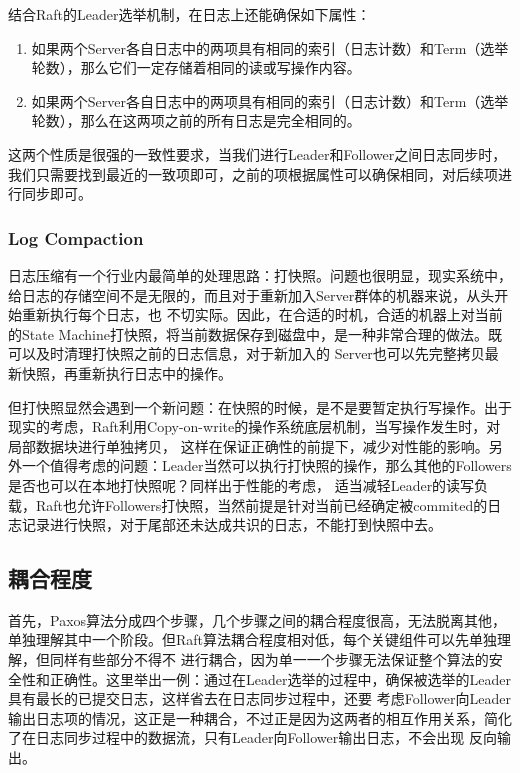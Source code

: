 \documentclass[UTF8]{article}
\begin{document}
结合Raft的Leader选举机制，在日志上还能确保如下属性：
\begin{enumerate}
    \item 如果两个Server各自日志中的两项具有相同的索引（日志计数）和Term（选举轮数），那么它们一定存储着相同的读或写操作内容。
    \item 如果两个Server各自日志中的两项具有相同的索引（日志计数）和Term（选举轮数），那么在这两项之前的所有日志是完全相同的。
\end{enumerate}

这两个性质是很强的一致性要求，当我们进行Leader和Follower之间日志同步时，我们只需要找到最近的一致项即可，之前的项根据属性可以确保相同，对后续项进行同步即可。


\subsubsection{Log Compaction}
日志压缩有一个行业内最简单的处理思路：打快照。问题也很明显，现实系统中，给日志的存储空间不是无限的，而且对于重新加入Server群体的机器来说，从头开始重新执行每个日志，也
不切实际。因此，在合适的时机，合适的机器上对当前的State Machine打快照，将当前数据保存到磁盘中，是一种非常合理的做法。既可以及时清理打快照之前的日志信息，对于新加入的
Server也可以先完整拷贝最新快照，再重新执行日志中的操作。

但打快照显然会遇到一个新问题：在快照的时候，是不是要暂定执行写操作。出于现实的考虑，Raft利用Copy-on-write的操作系统底层机制，当写操作发生时，对局部数据块进行单独拷贝，
这样在保证正确性的前提下，减少对性能的影响。另外一个值得考虑的问题：Leader当然可以执行打快照的操作，那么其他的Followers是否也可以在本地打快照呢？同样出于性能的考虑，
适当减轻Leader的读写负载，Raft也允许Followers打快照，当然前提是针对当前已经确定被commited的日志记录进行快照，对于尾部还未达成共识的日志，不能打到快照中去。


\subsection{耦合程度}
首先，Paxos算法分成四个步骤，几个步骤之间的耦合程度很高，无法脱离其他，单独理解其中一个阶段。但Raft算法耦合程度相对低，每个关键组件可以先单独理解，但同样有些部分不得不
进行耦合，因为单一一个步骤无法保证整个算法的安全性和正确性。这里举出一例：通过在Leader选举的过程中，确保被选举的Leader具有最长的已提交日志，这样省去在日志同步过程中，还要
考虑Follower向Leader输出日志项的情况，这正是一种耦合，不过正是因为这两者的相互作用关系，简化了在日志同步过程中的数据流，只有Leader向Follower输出日志，不会出现
反向输出。
\end{document}
